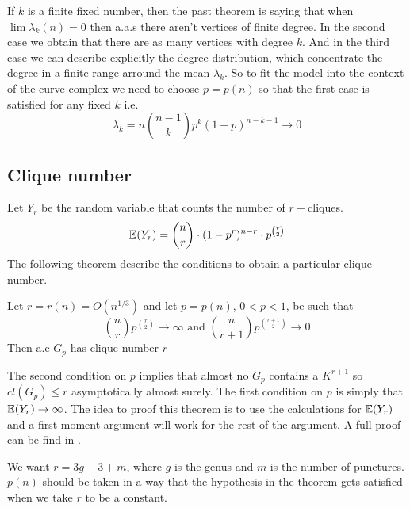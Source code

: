 If $k$ is a finite fixed number, then the past theorem is saying that when $\lim \lambda_{k}(n) = 0$ then a.a.s there aren't vertices of finite degree. In the second case we obtain that there are as many vertices with degree $k$. And in the third case we can describe explicitly the degree distribution, which concentrate the degree in a finite range arround the mean $\lambda_{k}$. So to fit the model into the context of the curve complex we need to choose $p = p(n)$ so that the first case is satisfied for any fixed $k$ i.e.
$$\lambda_{k} = n \binom{n-1}{k} p^{k} (1-p)^{n-k-1} \to 0$$

\subsection{Clique number}
Let $Y_{r}$ be the random variable that counts the number of $r-$cliques.
$$\mathbb{E}(Y_{r}) = \binom{n}{r} \cdot (1-p^{r})^{n-r} \cdot p^{\binom{r}{2}}  $$
The following theorem describe the conditions to obtain a particular clique number.

\begin{theorem}
Let $r = r(n) = O(n^{1/3})$ and let $p=p(n)$, $0<p<1$, be such that
$$\binom{n}{r} p^{\binom{r}{2}} \to \infty \text{ and } \binom{n}{r+1} p^{\binom{r+1}{2}} \to 0 $$
Then a.e $G_{p}$ has clique number $r$
\end{theorem}
The second condition on $p$ implies that almost no $G_{p}$ contains a $K^{r+1}$ so $cl(G_{p})\leq r$ asymptotically almost surely. The first condition on $p$ is simply that $\mathbb{E} (Y_{r}) \to  \infty$. The idea to proof this theorem is to use the calculations for $\mathbb{E}(Y_{r})$ and a first moment argument will work for the rest of the argument. A full proof can be find in \cite[Bollobás, p.290]{Bollobas}.

We want $r = 3g-3+m$, where $g$ is the genus and $m$ is the number of punctures. $p(n)$ should be taken in a way that the hypothesis in the theorem gets satisfied when we take $r$ to be a constant.






